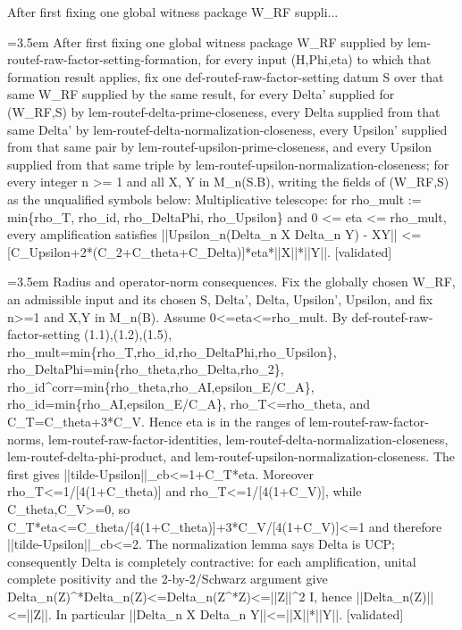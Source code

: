 \documentclass{article}
\newcommand{\step}[1]{\par\noindent\hangindent=3.5em\hangafter=1%
  \makebox[3.5em][l]{\textbf{#1.}}}
\newcommand{\steptag}[1]{\hfill{\small\textsf{[#1]}}}
\begin{document}
\begin{proofbox}{After first fixing one global witness package W\_RF suppli...}
\step{1} After first fixing one global witness package W\_RF supplied by lem-routef-raw-factor-setting-formation, for every input (H,Phi,eta) to which that formation result applies, fix one def-routef-raw-factor-setting datum S over that same W\_RF supplied by the same result, for every Delta' supplied for (W\_RF,S) by lem-routef-delta-prime-closeness, every Delta supplied from that same Delta' by lem-routef-delta-normalization-closeness, every Upsilon' supplied from that same pair by lem-routef-upsilon-prime-closeness, and every Upsilon supplied from that same triple by lem-routef-upsilon-normalization-closeness; for every integer n >= 1 and all X, Y in M\_n(S.B), writing the fields of (W\_RF,S) as the unqualified symbols below: Multiplicative telescope: for rho\_mult := min\{rho\_T, rho\_id, rho\_DeltaPhi, rho\_Upsilon\} and 0 <= eta <= rho\_mult, every amplification satisfies ||Upsilon\_n(Delta\_n X Delta\_n Y) - XY|| <= [C\_Upsilon+2*(C\_2+C\_theta+C\_Delta)]*eta*||X||*||Y||. \steptag{validated} \\[6pt]
\step{1.1} Radius and operator-norm consequences. Fix the globally chosen W\_RF, an admissible input and its chosen S, Delta', Delta, Upsilon', Upsilon, and fix n>=1 and X,Y in M\_n(B). Assume 0<=eta<=rho\_mult. By def-routef-raw-factor-setting (1.1),(1.2),(1.5), rho\_mult=min\{rho\_T,rho\_id,rho\_DeltaPhi,rho\_Upsilon\}, rho\_DeltaPhi=min\{rho\_theta,rho\_Delta,rho\_2\}, rho\_id\textasciicircum{}corr=min\{rho\_theta,rho\_AI,epsilon\_E/C\_A\}, rho\_id=min\{rho\_AI,epsilon\_E/C\_A\}, rho\_T<=rho\_theta, and C\_T=C\_theta+3*C\_V. Hence eta is in the ranges of lem-routef-raw-factor-norms, lem-routef-raw-factor-identities, lem-routef-delta-normalization-closeness, lem-routef-delta-phi-product, and lem-routef-upsilon-normalization-closeness. The first gives ||tilde-Upsilon||\_cb<=1+C\_T*eta. Moreover rho\_T<=1/[4(1+C\_theta)] and rho\_T<=1/[4(1+C\_V)], while C\_theta,C\_V>=0, so C\_T*eta<=C\_theta/[4(1+C\_theta)]+3*C\_V/[4(1+C\_V)]<=1 and therefore ||tilde-Upsilon||\_cb<=2. The normalization lemma says Delta is UCP; consequently Delta is completely contractive: for each amplification, unital complete positivity and the 2-by-2/Schwarz argument give Delta\_n(Z)\textasciicircum{}*Delta\_n(Z)<=Delta\_n(Z\textasciicircum{}*Z)<=||Z||\textasciicircum{}2 I, hence ||Delta\_n(Z)||<=||Z||. In particular ||Delta\_n X Delta\_n Y||<=||X||*||Y||. \steptag{validated} \\[4pt]

\end{proofbox}
\end{document}
